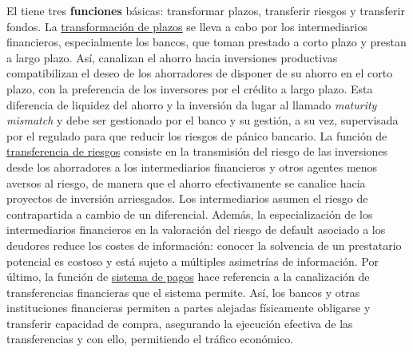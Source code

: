 \documentclass{nuevotema}
\begin{document}
El  tiene tres \textbf{funciones} básicas: transformar plazos, transferir riesgos y transferir fondos. La \underline{transformación de plazos} se lleva a cabo por los intermediarios financieros, especialmente los bancos, que toman prestado a corto plazo y prestan a largo plazo. Así, canalizan el ahorro hacia inversiones productivas compatibilizan el deseo de los ahorradores de disponer de su ahorro en el corto plazo, con la preferencia de los inversores por el crédito a largo plazo. Esta diferencia de liquidez del ahorro y la inversión da lugar al llamado \textit{maturity mismatch} y debe ser gestionado por el banco y su gestión, a su vez, supervisada por el regulado para que reducir los riesgos de pánico bancario. La función de \underline{transferencia de riesgos} consiste en la transmisión del riesgo de las inversiones desde los ahorradores a los intermediarios financieros y otros agentes menos aversos al riesgo, de manera que el ahorro efectivamente se canalice hacia proyectos de inversión arriesgados. Los intermediarios asumen el riesgo de contrapartida a cambio de un diferencial. Además, la especialización de los intermediarios financieros en la valoración del riesgo de default asociado a los deudores reduce los costes de información: conocer la solvencia de un prestatario potencial es costoso y está sujeto a múltiples asimetrías de información. Por último, la función de \underline{sistema de pagos} hace referencia a la canalización de transferencias financieras que el sistema permite. Así, los bancos y otras instituciones financieras permiten a partes alejadas físicamente obligarse y transferir capacidad de compra, asegurando la ejecución efectiva de las transferencias y con ello, permitiendo el tráfico económico.
\end{document}
